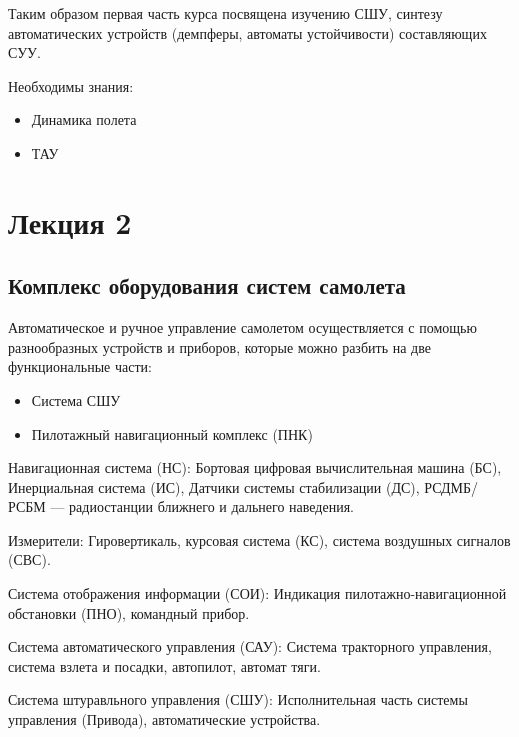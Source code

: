 \documentclass{article}
\begin{document}
Таким образом первая часть курса посвящена изучению СШУ, синтезу автоматических
устройств (демпферы, автоматы устойчивости) составляющих СУУ.

Необходимы знания:
\begin{itemize}
    \item Динамика полета
    \item ТАУ
\end{itemize}
\newpage

\section{Лекция 2}
\subsection{Комплекс оборудования систем самолета}

Автоматическое и ручное управление самолетом осуществляется с помощью
разнообразных устройств и приборов, которые можно разбить на две функциональные
части:
\begin{itemize}
    \item{Система СШУ}
    \item{Пилотажный навигационный комплекс (ПНК)}
\end{itemize}

Навигационная система (НС): Бортовая цифровая вычислительная машина (БС),
Инерциальная система (ИС), Датчики системы стабилизации (ДС), РСДМБ/РСБМ ---
радиостанции ближнего и дальнего наведения.

Измерители: Гировертикаль, курсовая система (КС), система воздушных сигналов
(СВС).

Система отображения информации (СОИ): Индикация пилотажно-навигационной
обстановки (ПНО), командный прибор.

Система автоматического управления (САУ): Система тракторного управления,
система взлета и посадки, автопилот, автомат тяги.

Система штуравльного управления (СШУ): Исполнительная часть системы управления
(Привода), автоматические устройства.
\end{document}
